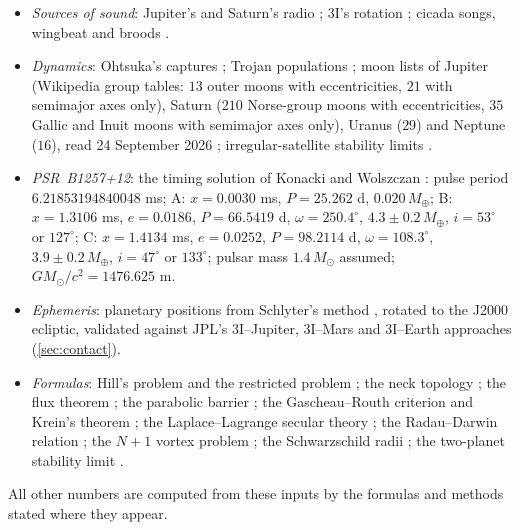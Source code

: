 \documentclass[11pt]{article}
\theoremstyle{definition}\newtheorem{definition}[theorem]{Definition}
\theoremstyle{remark}\newtheorem{remark}[theorem]{Remark}
\begin{document}
\begin{itemize}
\item \emph{Sources of sound}: Jupiter's and Saturn's radio \cite{Louis,SKAWB}; 3I's rotation \cite{SantanaRos25,ScarmatoLoeb}; cicada songs, wingbeat and broods \cite{YoungJosephson,Wan,BroodXIX}.
\item \emph{Dynamics}: Ohtsuka's captures \cite{Ohtsuka}; Trojan populations \cite{WikiMoons,dlFM,HuiTrojan,NesvornyDones}; moon lists of Jupiter (Wikipedia group tables: $13$ outer moons with eccentricities, $21$ with semimajor axes only), Saturn ($210$ Norse-group moons with eccentricities, $35$ Gallic and Inuit moons with semimajor axes only), Uranus ($29$) and Neptune ($16$), read 24 September 2026 \cite{WikiMoons}; irregular-satellite stability limits \cite{Nesvorny03}.
\item \emph{PSR~B1257+12}: the timing solution of Konacki and Wolszczan \cite{KW03}: pulse period $6.21853194840048$ ms; A: $x=0.0030$ ms, $P=25.262$ d, $0.020\,M_\oplus$; B: $x=1.3106$ ms, $e=0.0186$, $P=66.5419$ d, $\omega=250.4^\circ$, $4.3\pm0.2\,M_\oplus$, $i=53^\circ$ or $127^\circ$; C: $x=1.4134$ ms, $e=0.0252$, $P=98.2114$ d, $\omega=108.3^\circ$, $3.9\pm0.2\,M_\oplus$, $i=47^\circ$ or $133^\circ$; pulsar mass $1.4\,M_\odot$ assumed; $GM_\odot/c^2=1476.625$ m.
\item \emph{Ephemeris}: planetary positions from Schlyter's method \cite{Schlyter}, rotated to the J2000 ecliptic, validated against JPL's 3I--Jupiter, 3I--Mars and 3I--Earth approaches (\cref{sec:contact}).
\item \emph{Formulas}: Hill's problem and the restricted problem \cite{MD}; the neck topology \cite{Conley,McGehee,KLMR,Gomez}; the flux theorem \cite{MacKay}; the parabolic barrier \cite{LL}; the Gascheau--Routh criterion and Krein's theorem \cite{Gascheau,Routh,MHO}; the Laplace--Lagrange secular theory \cite{MD}; the Radau--Darwin relation \cite{MilitzerHubbard2023}; the $N+1$ vortex problem \cite{Cabral,BHW}; the Schwarzschild radii \cite{MTW}; the two-planet stability limit \cite{Gladman}.
\end{itemize}
All other numbers are computed from these inputs by the formulas and methods stated where they appear.
\end{document}
